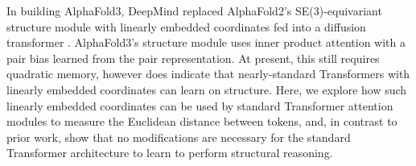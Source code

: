 In building AlphaFold3, DeepMind replaced AlphaFold2's SE(3)-equivariant structure module with linearly embedded coordinates fed into a diffusion transformer \citep{abramson_accurate_2024}.
AlphaFold3's structure module uses inner product attention with a pair bias learned from the pair representation.
At present, this still requires quadratic memory, however does indicate that nearly-standard Transformers with linearly embedded coordinates can learn on structure.
Here, we explore how such linearly embedded coordinates can be used by standard Transformer attention modules to measure the Euclidean distance between tokens, and, in contrast to prior work, show that no modifications are necessary for the standard Transformer architecture to learn to perform structural reasoning.